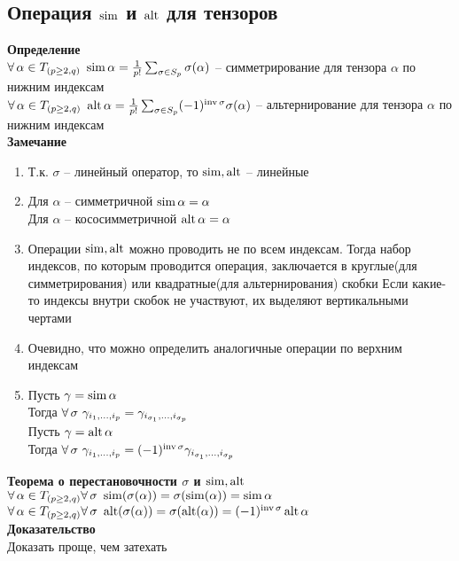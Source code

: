\documentclass[12pt]{article}
\begin{document}
\subsection{Операция $\operatorname{sim}$ и $\operatorname{alt}$ для тензоров}
\textbf{Определение}\\
$\forall\, \alpha\in T_{(p \geq 2, q)}\ \operatorname{sim} \alpha = \frac1{p!}\sum_{\sigma\in S_p} \sigma(\alpha)$ -- симметрирование для тензора $\alpha$ по нижним индексам\\
$\forall\, \alpha\in T_{(p \geq 2, q)}\ \operatorname{alt} \alpha = \frac1{p!}\sum_{\sigma\in S_p} (-1)^{\operatorname{inv} \sigma}\sigma(\alpha)$ -- альтернирование для тензора $\alpha$ по нижним индексам\\
\textbf{Замечание}
\begin{enumerate}
    \item Т.к. $\sigma$ -- линейный оператор, то $\operatorname{sim}, \operatorname{alt}$ -- линейные
    \item Для $\alpha$ -- симметричной $\operatorname{sim} \alpha = \alpha$\\
    Для $\alpha$ -- кососимметричной $\operatorname{alt} \alpha = \alpha$
    \item Операции $\operatorname{sim}, \operatorname{alt}$ можно проводить не по всем индексам. Тогда набор индексов, по которым проводится операция, заключается в круглые(для симметрирования) или квадратные(для альтернирования) скобки
    Если какие-то индексы внутри скобок не участвуют, их выделяют вертикальными чертами
    \item Очевидно, что можно определить аналогичные операции по верхним индексам
    \item Пусть $\gamma = \operatorname{sim} \alpha$\\
    Тогда $\forall\, \sigma\ \gamma_{i_1,\ldots, i_p} = \gamma_{i_{\sigma_1},\ldots,i_{\sigma_p}}$\\
    Пусть $\gamma = \operatorname{alt} \alpha$\\
    Тогда $\forall\, \sigma\ \gamma_{i_1,\ldots, i_p} = (-1)^{\operatorname{inv} \sigma}\gamma_{i_{\sigma_1},\ldots,i_{\sigma_p}}$
\end{enumerate}
\textbf{Теорема о перестановочности $\sigma$ и $\operatorname{sim}, \operatorname{alt}$}\\
$\forall\, \alpha \in T_{(p \geq 2,q)} \forall\, \sigma\ \operatorname{sim}(\sigma(\alpha)) = \sigma(\operatorname{sim}(\alpha)) = \operatorname{sim} \alpha$\\
$\forall\, \alpha \in T_{(p \geq 2,q)} \forall\, \sigma\ \operatorname{alt}(\sigma(\alpha)) = \sigma(\operatorname{alt}(\alpha)) = (-1)^{\operatorname{inv} \sigma}\operatorname{alt} \alpha$\\
\textbf{Доказательство}\\
Доказать проще, чем затехать\\
\end{document}
